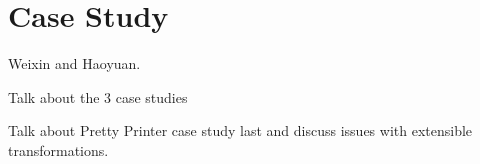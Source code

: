\section{Case Study}

Weixin and Haoyuan.

Talk about the 3 case studies

Talk about Pretty Printer case study last and discuss issues with
extensible transformations.


